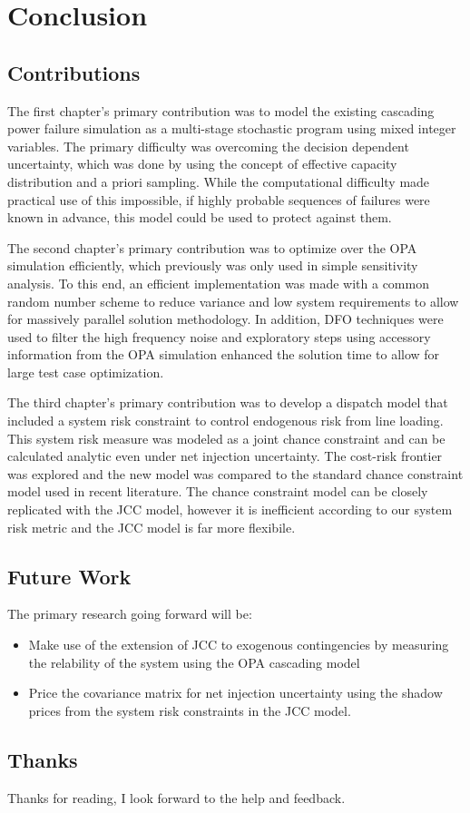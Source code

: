 
\chapter{Conclusion}
\section{Contributions}
The first chapter's primary contribution was to model the existing cascading power failure simulation as a multi-stage stochastic program using mixed integer variables.  The primary difficulty was overcoming the decision dependent uncertainty, which was done by using the concept of effective capacity distribution and a priori sampling.  While the computational difficulty made practical use of this impossible, if highly probable sequences of failures were known in advance, this model could be used to protect against them.

The second chapter's primary contribution was to optimize over the OPA simulation efficiently, which previously was only used in simple sensitivity analysis.  To this end, an efficient implementation was made with a common random number scheme to reduce variance and low system requirements to allow for massively parallel solution methodology.  In addition, DFO techniques were used to filter the high frequency noise and exploratory steps using accessory information from the OPA simulation enhanced the solution time to allow for large test case optimization.

The third chapter's primary contribution was to develop a dispatch model that included a system risk constraint to control endogenous risk from line loading.  This system risk measure was modeled as a joint chance constraint and can be calculated analytic even under net injection uncertainty.  The cost-risk frontier was explored and the new model was compared to the standard chance constraint model used in recent literature.  The chance constraint model can be closely replicated with the JCC model, however it is inefficient according to our system risk metric and the JCC model is far more flexibile.

\section{Future Work}
The primary research going forward will be:
\begin{itemize}
\item Make use of the extension of JCC to exogenous contingencies by measuring the relability of the system using the OPA cascading model
\item Price the covariance matrix for net injection uncertainty using the shadow prices from the system risk constraints in the JCC model.
\end{itemize}

\section*{Thanks}
Thanks for reading, I look forward to the help and feedback.


	
		

\theendnotes
